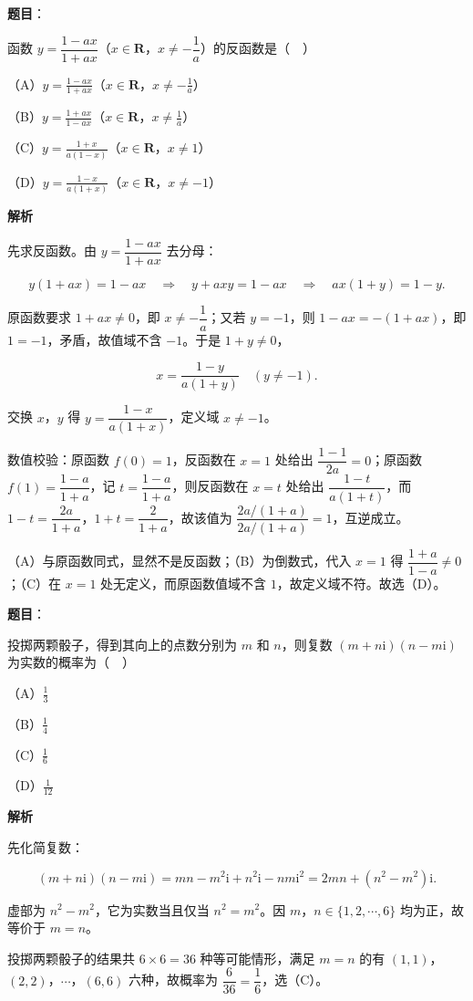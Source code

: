 \begin{answer}

\textbf{题目}：

函数 $y=\dfrac{1-ax}{1+ax}$（$x\in\mathbf R$，$x\neq-\dfrac1a$）的反函数是（　）

（A）$y=\frac{1-ax}{1+ax}$（$x\in\mathbf R$，$x\neq-\frac1a$）

（B）$y=\frac{1+ax}{1-ax}$（$x\in\mathbf R$，$x\neq\frac1a$）

（C）$y=\frac{1+x}{a(1-x)}$（$x\in\mathbf R$，$x\neq1$）

（D）$y=\frac{1-x}{a(1+x)}$（$x\in\mathbf R$，$x\neq-1$）

\textbf{解析}

先求反函数。由 $y=\dfrac{1-ax}{1+ax}$ 去分母：

\nopagebreak[4]
\[y(1+ax)=1-ax\quad\Longrightarrow\quad y+axy=1-ax\quad\Longrightarrow\quad ax(1+y)=1-y.\]

原函数要求 $1+ax\neq0$，即 $x\neq-\dfrac1a$；又若 $y=-1$，则 $1-ax=-(1+ax)$，即 $1=-1$，矛盾，故值域不含 $-1$。于是 $1+y\neq0$，

\nopagebreak[4]
\[x=\frac{1-y}{a(1+y)}\quad(y\neq-1).\]

交换 $x$，$y$ 得 $y=\dfrac{1-x}{a(1+x)}$，定义域 $x\neq-1$。

数值校验：原函数 $f(0)=1$，反函数在 $x=1$ 处给出 $\dfrac{1-1}{2a}=0$；原函数 $f(1)=\dfrac{1-a}{1+a}$，记 $t=\dfrac{1-a}{1+a}$，则反函数在 $x=t$ 处给出 $\dfrac{1-t}{a(1+t)}$，而 $1-t=\dfrac{2a}{1+a}$，$1+t=\dfrac{2}{1+a}$，故该值为 $\dfrac{2a/(1+a)}{2a/(1+a)}=1$，互逆成立。

（A）与原函数同式，显然不是反函数；（B）为倒数式，代入 $x=1$ 得 $\dfrac{1+a}{1-a}\neq0$；（C）在 $x=1$ 处无定义，而原函数值域不含 $1$，故定义域不符。故选（D）。


\end{answer}
\begin{answer}

\textbf{题目}：

投掷两颗骰子，得到其向上的点数分别为 $m$ 和 $n$，则复数 $(m+n\mathrm i)(n-m\mathrm i)$ 为实数的概率为（　）

（A）$\frac13$

（B）$\frac14$

（C）$\frac16$

（D）$\frac1{12}$

\textbf{解析}

先化简复数：

\nopagebreak[4]
\[(m+n\mathrm i)(n-m\mathrm i)=mn-m^2\mathrm i+n^2\mathrm i-nm\mathrm i^2=2mn+(n^2-m^2)\mathrm i.\]

虚部为 $n^2-m^2$，它为实数当且仅当 $n^2=m^2$。因 $m$，$n\in\{1,2,\cdots,6\}$ 均为正，故等价于 $m=n$。

投掷两颗骰子的结果共 $6\times6=36$ 种等可能情形，满足 $m=n$ 的有 $(1,1)$，$(2,2)$，$\cdots$，$(6,6)$ 六种，故概率为 $\dfrac{6}{36}=\dfrac16$，选（C）。


\end{answer}
